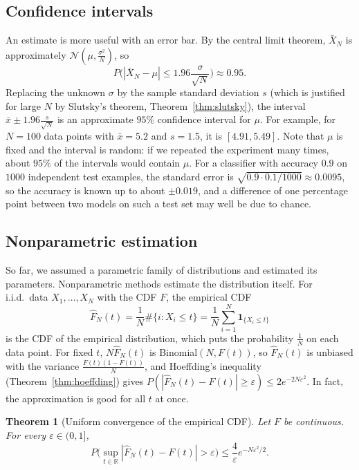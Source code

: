 \documentclass[11pt]{article}
\theoremstyle{definition}
\theoremstyle{plain}
\newtheorem{theorem}[definition]{Theorem}
\theoremstyle{remark}
\begin{document}
\subsection{Confidence intervals}

An estimate is more useful with an error bar. By the central limit theorem, $\bar X_N$ is approximately $\mathcal{N}(\mu, \frac{\sigma^2}{N})$, so
\[P\Big(|\bar X_N - \mu| \leq 1.96\frac{\sigma}{\sqrt{N}}\Big) \approx 0.95.\]
Replacing the unknown $\sigma$ by the sample standard deviation $s$ (which is justified for large $N$ by Slutsky's theorem, Theorem~\ref{thm:slutsky}), the interval $\bar x \pm 1.96\frac{s}{\sqrt{N}}$ is an approximate $95\%$ confidence interval for $\mu$. For example, for $N = 100$ data points with $\bar x = 5.2$ and $s = 1.5$, it is $[4.91, 5.49]$. Note that $\mu$ is fixed and the interval is random: if we repeated the experiment many times, about $95\%$ of the intervals would contain $\mu$. For a classifier with accuracy $0.9$ on $1000$ independent test examples, the standard error is $\sqrt{0.9 \cdot 0.1/1000} \approx 0.0095$, so the accuracy is known up to about $\pm 0.019$, and a difference of one percentage point between two models on such a test set may well be due to chance.

\subsection{Nonparametric estimation}\label{sec:nonparametric}

So far, we assumed a parametric family of distributions and estimated its parameters. Nonparametric methods estimate the distribution itself. For i.i.d.\ data $X_1, \ldots, X_N$ with the CDF $F$, the empirical CDF
\[\hat F_N(t) = \frac{1}{N}\#\{i : X_i \leq t\} = \frac{1}{N}\sum_{i=1}^N \mathbf{1}_{\{X_i \leq t\}}\]
is the CDF of the empirical distribution, which puts the probability $\frac{1}{N}$ on each data point. For fixed $t$, $N\hat F_N(t)$ is Binomial$(N, F(t))$, so $\hat F_N(t)$ is unbiased with the variance $\frac{F(t)(1 - F(t))}{N}$, and Hoeffding's inequality (Theorem~\ref{thm:hoeffding}) gives $P(|\hat F_N(t) - F(t)| \geq \varepsilon) \leq 2e^{-2N\varepsilon^2}$. In fact, the approximation is good for all $t$ at once.

\begin{theorem}[Uniform convergence of the empirical CDF]\label{thm:glivenko-cantelli}
    Let $F$ be continuous. For every $\varepsilon \in (0, 1]$,
    \[P\Big(\sup_{t \in \mathbb{R}} |\hat F_N(t) - F(t)| > \varepsilon\Big) \leq \frac{4}{\varepsilon}e^{-N\varepsilon^2/2}.\]
\end{theorem}
\end{document}
